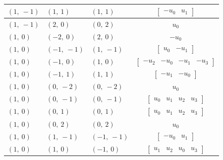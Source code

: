 \documentclass[11pt]{article}
\theoremstyle{definition}
\begin{document}
\begin{longtable}{|l|l|l|c|}
    \hline
    $\left( 1, \  -1\right)$ & $\left( 1, \  1\right)$ & $\left( 1, \  1\right)$ & $\left[\begin{matrix}- u_{0} & u_{1}\end{matrix}\right]$ \\
    \hline
    $\left( 1, \  -1\right)$ & $\left( 2, \  0\right)$ & $\left( 0, \  2\right)$ & $u_{0}$ \\
    \hline
    $\left( 1, \  0\right)$ & $\left( -2, \  0\right)$ & $\left( 2, \  0\right)$ & $- u_{0}$ \\
    \hline
    $\left( 1, \  0\right)$ & $\left( -1, \  -1\right)$ & $\left( 1, \  -1\right)$ & $\left[\begin{matrix}u_{0} & - u_{1}\end{matrix}\right]$ \\
    \hline
    $\left( 1, \  0\right)$ & $\left( -1, \  0\right)$ & $\left( 1, \  0\right)$ & $\left[\begin{matrix}- u_{2} & - u_{0} & - u_{1} & - u_{3}\end{matrix}\right]$ \\
    \hline
    $\left( 1, \  0\right)$ & $\left( -1, \  1\right)$ & $\left( 1, \  1\right)$ & $\left[\begin{matrix}- u_{1} & - u_{0}\end{matrix}\right]$ \\
    \hline
    $\left( 1, \  0\right)$ & $\left( 0, \  -2\right)$ & $\left( 0, \  -2\right)$ & $u_{0}$ \\
    \hline
    $\left( 1, \  0\right)$ & $\left( 0, \  -1\right)$ & $\left( 0, \  -1\right)$ & $\left[\begin{matrix}u_{0} & u_{1} & u_{2} & u_{3}\end{matrix}\right]$ \\
    \hline
    $\left( 1, \  0\right)$ & $\left( 0, \  1\right)$ & $\left( 0, \  1\right)$ & $\left[\begin{matrix}u_{0} & u_{1} & u_{2} & u_{3}\end{matrix}\right]$ \\
    \hline
    $\left( 1, \  0\right)$ & $\left( 0, \  2\right)$ & $\left( 0, \  2\right)$ & $u_{0}$ \\
    \hline
    $\left( 1, \  0\right)$ & $\left( 1, \  -1\right)$ & $\left( -1, \  -1\right)$ & $\left[\begin{matrix}- u_{0} & u_{1}\end{matrix}\right]$ \\
    \hline
    $\left( 1, \  0\right)$ & $\left( 1, \  0\right)$ & $\left( -1, \  0\right)$ & $\left[\begin{matrix}u_{1} & u_{2} & u_{0} & u_{3}\end{matrix}\right]$ \\

\end{longtable}
\end{document}
